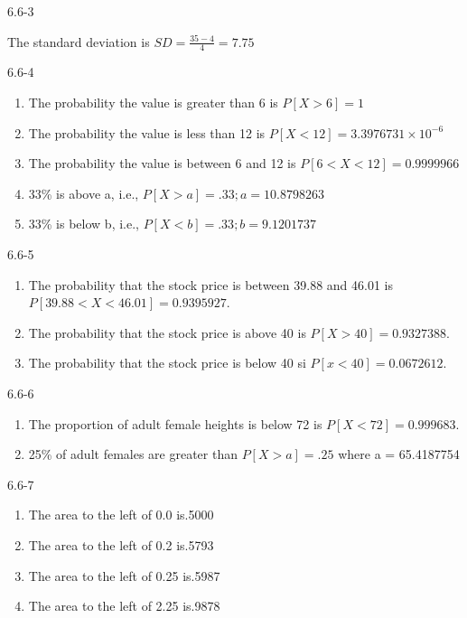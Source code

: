 \begin{exsol@solution}{6.6-3}


    The standard deviation is $SD = \frac{35 - 4}{4} = 7.75$
\end{exsol@solution}
\begin{exsol@solution}{6.6-4}

\begin{enumerate}
\item The probability the value is greater than 6 is $P[X > 6] = 1$
\item The probability the value is less than 12 is $P[X < 12] = \ensuremath{3.3976731\times 10^{-6}}$
\item The probability the value is between 6 and 12 is $P[ 6 < X < 12] = 0.9999966$
\item 33\% is above a, i.e., $P[X > a] = .33; a = 10.8798263$
\item 33\% is below b, i.e., $P[X < b] = .33; b = 9.1201737$
\end{enumerate}
\end{exsol@solution}
\begin{exsol@solution}{6.6-5}

\begin{enumerate}
\item The probability that the stock price is between 39.88 and 46.01 is $P[39.88 < X < 46.01] = 0.9395927$.
\item The probability that the stock price is above 40 is $P[X > 40] = 0.9327388$.
\item The probability that the stock price is below 40 si $P[ x < 40] = 0.0672612$.
\end{enumerate}
\end{exsol@solution}
\begin{exsol@solution}{6.6-6}

\begin{enumerate}
\item The proportion of adult female heights is below 72 is $P[ X < 72] = 0.999683$.
\item 25\% of adult females are greater than $P[ X > a] = .25$ where a = 65.4187754
\end{enumerate}
\end{exsol@solution}
\begin{exsol@solution}{6.6-7}
\begin{enumerate}
\item The area to the left of 0.0 is.5000
\item The area to the left of 0.2 is.5793
\item The area to the left of 0.25 is.5987
\item The area to the left of 2.25 is.9878
\end{enumerate}
\end{exsol@solution}

